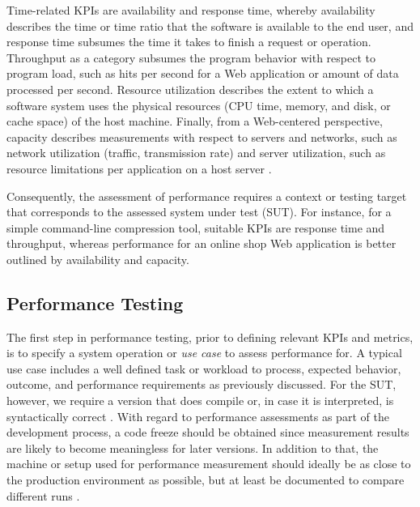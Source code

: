 Time-related KPIs are availability and response time, whereby
availability describes the time or time ratio that the software is available to
the end user, and response time subsumes the time it takes to finish a request
or operation. Throughput as a category subsumes the program behavior with
respect to program load, such as hits per second for a Web application or
amount of data processed per second. Resource utilization describes the extent
to which a software system uses the physical resources (CPU time, memory, and
disk, or cache space) of the host machine. Finally, from a Web-centered
perspective, capacity describes measurements with respect to servers and
networks, such as network utilization  (traffic, transmission rate) and server
utilization, such as resource limitations per application on a host server
\citep{molyneaux_art_2014}.

Consequently, the assessment of performance requires a context or testing
target that corresponds to the assessed system under test (SUT). For instance,
for a simple command-line compression tool, suitable KPIs are response time and
throughput, whereas performance for an online shop Web application is better
outlined by availability and capacity.

\subsection{Performance Testing}
The first step in performance testing, prior to defining relevant KPIs and
metrics, is to specify a system operation or \emph{use case}
\citep{woodside_future_2007} to assess performance for. A typical use case includes a well defined task or
workload to process, expected behavior, outcome, and performance
requirements as previously discussed. For the SUT, however, we require a
version that does compile or, in case it is interpreted, is syntactically
correct \citep{molyneaux_art_2014}. With regard to performance assessments as part of
the development process, a code freeze should be obtained since measurement
results are likely to become meaningless for later versions. In addition to
that,  the machine or setup used for performance measurement should ideally be
as close to the production environment as possible, but at least be documented
to compare different runs \citep{molyneaux_art_2014}.

